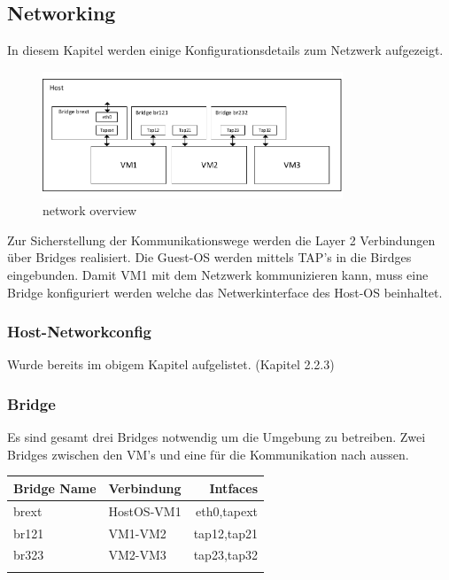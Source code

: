 \documentclass[a4,12pt]{scrartcl}
\begin{document}
\subsection{Networking}
In diesem Kapitel werden einige Konfigurationsdetails zum Netzwerk aufgezeigt.
\begin{figure} [H]
	\begin{center}
	\includegraphics[width=0.80\textwidth]{./draws/uebersicht_bridges_taps_visio.pdf}
	\caption{{network overview}}
	\label{virtualdir}
	\end{center}
\end{figure}

\noindent Zur Sicherstellung der Kommunikationswege werden die Layer 2 Verbindungen über Bridges realisiert. Die Guest-OS werden mittels TAP's in die Birdges eingebunden. Damit VM1 mit dem Netzwerk kommunizieren kann, muss eine Bridge konfiguriert werden welche das Netwerkinterface  des Host-OS beinhaltet.

\subsubsection{Host-Networkconfig}
Wurde bereits im obigem Kapitel aufgelistet. (Kapitel 2.2.3)
 
\subsubsection{Bridge}
Es sind gesamt drei Bridges notwendig um die Umgebung zu betreiben. Zwei Bridges zwischen den VM's und eine für die Kommunikation  nach aussen.
\begin{center}
    \begin{tabular}{@{} l l r@{}}\toprule    
    {Bridge Name} & {Verbindung} & {Intfaces}\\ \toprule
    brext & HostOS-VM1 & eth0,tapext\\ 
    br121 & VM1-VM2 & tap12,tap21\\
    br323 & VM2-VM3 & tap23,tap32\\ \addlinespace
    \bottomrule
    \end{tabular}
\end{center}
\end{document}
